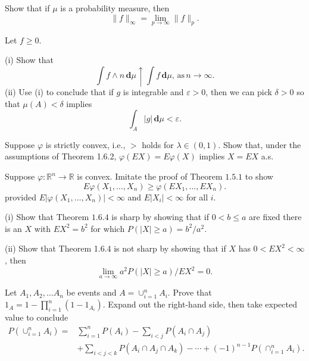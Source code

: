 \documentclass[en, normal, 11pt, black]{elegantnote}
\newenvironment{exercise}[1]{\begin{tcolorbox}[colback=black!15, colframe=black!80, breakable, title=#1]}{\end{tcolorbox}}
\newcommand{\der}{\,\mathbf{d}}
\begin{document}
    \begin{exercise}{1.5.2}
        Show that if $\mu$ is a probability measure, then
        \[
            \|f\|_{\infty}=\lim_{p\to\infty}\|f\|_p. 
        \]
    \end{exercise}


    \begin{exercise}{1.5.7}
        Let $f\geqslant0$. 
        
        (i) Show that
        \[
            \int f\wedge n\der\mu\uparrow\int f\der\mu,\,\text{as}\,n\to\infty. 
        \]
        (ii) Use (i) to conclude that if $g$ is integrable and $\varepsilon>0$, then we can pick $\delta > 0$ so that $\mu(A) < \delta$ implies
        \[
            \int_A|g|\der\mu<\varepsilon. 
        \]
    \end{exercise}

    \begin{exercise}{1.6.1}
        Suppose $\varphi$ is strictly convex, i.e., $>$ holds for $\lambda \in(0,1)$. Show that, under the assumptions of Theorem 1.6.2, $\varphi(E X)=E \varphi(X)$ implies $X=E X$ a.s. 
    \end{exercise}



    \begin{exercise}{1.6.2}
        Suppose $\varphi: \mathbb{R}^{n} \rightarrow \mathbb{R}$ is convex. Imitate the proof of Theorem $1.5.1$ to show
        \[
            E \varphi\left(X_{1}, \ldots, X_{n}\right) \geq \varphi\left(E X_{1}, \ldots, E X_{n}\right). 
        \]
        provided $E\left|\varphi\left(X_{1}, \ldots, X_{n}\right)\right|<\infty$ and $E\left|X_{i}\right|<\infty$ for all $i$. 
    \end{exercise}



    \begin{exercise}{1.6.3. Chebyshev's inequality is and is not sharp.}        
        (i) Show that Theorem $1.6.4$ is sharp by showing that if $0<b \leq a$ are fixed there is an $X$ with $E X^{2}=b^{2}$ for which $P(|X| \geq a)=b^{2} / a^{2}$. 
        
        (ii) Show that Theorem 1.6.4 is not sharp by showing that if $X$ has $0<E X^{2}<\infty$, then
        \[
            \lim _{a \rightarrow \infty} a^{2} P(|X| \geq a) / E X^{2}=0. 
        \]
    \end{exercise}


    \begin{exercise}{1.6.9. Inclusion-exclusion formula.}
        Let $A_{1}, A_{2}, \ldots A_{n}$ be events and $A=\cup_{i=1}^{n} A_{i}$. Prove that $1_{A}=1-\prod_{i=1}^{n}\left(1-1_{A_{i}}\right)$. Expand out the right-hand side, then take expected value to conclude
        \begin{align*}
            P\left(\cup_{i=1}^{n} A_{i}\right)=& \sum_{i=1}^{n} P\left(A_{i}\right)-\sum_{i<j} P\left(A_{i} \cap A_{j}\right) \\
            &+\sum_{i<j<k} P\left(A_{i} \cap A_{j} \cap A_{k}\right)-\cdots+(-1)^{n-1} P\left(\cap_{i=1}^{n} A_{i}\right). 
        \end{align*}
    \end{exercise}
\end{document}
